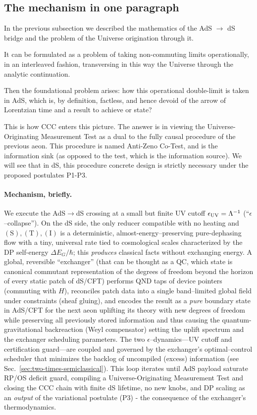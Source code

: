 \documentclass[10pt]{article}
\theoremstyle{definition}
\theoremstyle{plain}
\begin{document}
\subsection{The mechanism in one paragraph}
\label{subsec:intro-mechanism}
In the previous subsection we described the mathematics of the AdS $\to$ dS bridge and the problem of the Universe origination through it.

It can be formulated as a problem of taking non-commuting limits operationally, in an interleaved fashion, transversing in this way the Universe through the analytic continuation.

Then the foundational problem arises: how this operational double-limit is taken in AdS, which is, by definition, factless, and hence devoid of the arrow of Lorentzian time and a result to achieve or state?

This is how CCC enters this picture. The answer is in viewing the Universe-Originating Measurement Test as a dual to the fully causal procedure of the previous aeon. This procedure is named Anti-Zeno Co-Test, and is the information sink (as opposed to the test, which is the information source). We will see that in dS, this procedure concrete design is strictly necessary under the proposed postulates P1-P3.


\paragraph{Mechanism, briefly.} We execute the AdS$\to$dS crossing at a small but finite UV cutoff \(\epsilon_{\rm UV} = \Lambda^{-1}\) (``$\epsilon$–collapse''). On the dS side, the only reducer compatible with no heating and \((\mathrm S),(\mathrm T),(\mathrm I)\) is a deterministic, almost-energy–preserving pure-dephasing flow with a tiny, universal rate tied to cosmological scales characterized by the DP self-energy $\Delta E_G/\hbar$; this \emph{produces} classical facts without exchanging energy.\label{par:uom-main-002}
A global, reversible ``exchanger'' (that can be thought as a QC, which state is canonical commutant representation of the degrees of freedom beyond the horizon of every static patch of dS/CFT) performs QND taps of device pointers (commuting with $H$), reconciles patch data into a single band–limited global field under constraints (sheaf gluing), and encodes the result as a \emph{pure} boundary state in AdS/CFT for the next aeon uplifting its theory with new degrees of freedom while preserving all previously stored information and thus causing the quantum-gravitational backreaction (Weyl compensator) setting the uplift spectrum and the exchanger scheduling parameters.
The two $\epsilon$--dynamics---UV cutoff and certification guard---are coupled and governed by the exchanger's optimal--control scheduler that minimizes the backlog of uncompiled (excess) information (see Sec.~\ref{sec:two-times-semiclassical}).
This loop iterates until AdS payload saturate RP/OS deficit guard, compiling a Universe-Originating Measurement Test and closing the CCC chain with finite dS lifetime, no new knobs, and DP scaling as an \emph{output} of the variational postulate (P3) - the consequence of the exchanger's thermodynamics.
\end{document}
